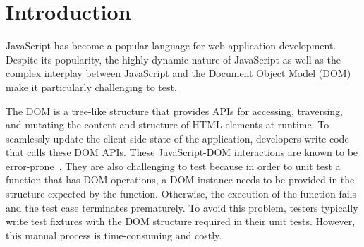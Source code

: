 \section{Introduction}
%
JavaScript has become a popular language for web application development. 
Despite its popularity, the highly dynamic nature of JavaScript as well as the complex interplay between JavaScript and  the Document Object Model (DOM) make it particularly challenging to test. 

The DOM is a tree-like structure that provides APIs \cite{w3dom} for accessing, traversing, and mutating the content and structure of HTML elements at runtime. To seamlessly update the client-side state of the application, developers write \js code that calls these DOM APIs. These JavaScript-DOM interactions are known to be error-prone~\cite{frolin2013}. They are also challenging to test because in order to unit test a \js function that has DOM operations, a DOM instance needs to be provided in the structure expected by the function. Otherwise, the execution of the function fails and the test case terminates prematurely.
To avoid this problem, testers typically write test fixtures with the DOM structure required in their \js unit tests. However, this manual process is time-consuming and costly.

